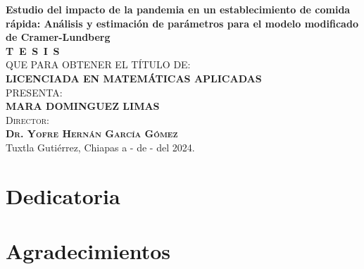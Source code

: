 \begin{titlepage}
\begin{minipage}[t][0.95\textheight][c]{0.76\textwidth}
            \begin{center}
                {\Large\bfseries Estudio del impacto de la pandemia en un establecimiento de comida rápida: Análisis y estimación de parámetros para el modelo modificado de Cramer-Lundberg}\\[2cm]
                \textsc{\huge \textbf{T\, E\, S\, I\, S}}\\[1.5cm]
                \textsc{\large QUE PARA OBTENER EL TÍTULO DE:}\\[0.3cm]
                \textbf{\textsc{LICENCIADA EN MATEMÁTICAS APLICADAS}}\\[1.5cm]
                \textsc{\large PRESENTA:}\\[0.3cm]
                \textbf{\textsc{\large {MARA DOMINGUEZ LIMAS}}}\\[2cm]
                {\large\scshape Director:\\[0.3cm]
                {\textbf{\large Dr. Yofre Hernán García Gómez }}}\\[2.0cm]
                \large{Tuxtla Gutiérrez, Chiapas a - de - del 2024.}

            \end{center}
\end{minipage}
\end{titlepage}

\pagebreak[2]

\chapter*{Dedicatoria}



\chapter*{Agradecimientos}

